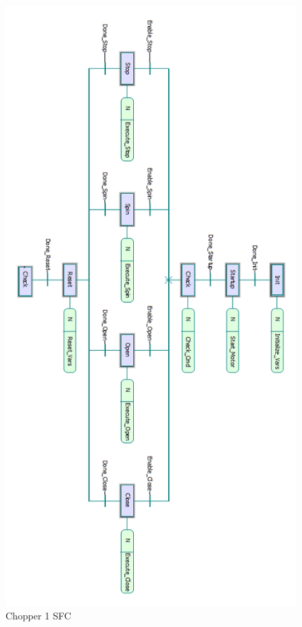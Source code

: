 \documentclass{article}
\begin{document}
        \begin{figure}[h]
            \centering
            \includegraphics[scale=0.6]{img/ch1_sfc}
            \caption{Chopper 1 SFC}
            \label{fig:ch1_sfc}
        \end{figure}
        
\end{document}
